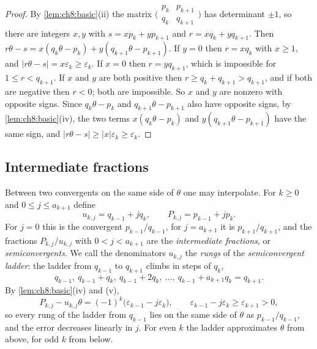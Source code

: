 \begin{proof}
By \cref{lem:ch8:basic}(ii) the matrix
$\bigl(\begin{smallmatrix}p_k&p_{k+1}\\q_k&q_{k+1}\end{smallmatrix}\bigr)$
has determinant $\pm1$, so there are integers $x,y$ with $s=xp_k+yp_{k+1}$ and
$r=xq_k+yq_{k+1}$. Then
$r\theta-s=x(q_k\theta-p_k)+y(q_{k+1}\theta-p_{k+1})$. If $y=0$ then
$r=xq_k$ with $x\geq1$, and $|r\theta-s|=x\varepsilon_k\geq\varepsilon_k$. If
$x=0$ then $r=yq_{k+1}$, which is impossible for $1\leq r<q_{k+1}$. If $x$
and $y$ are both positive then $r\geq q_k+q_{k+1}>q_{k+1}$, and if both are
negative then $r<0$; both are impossible. So $x$ and $y$ are nonzero with
opposite signs. Since $q_k\theta-p_k$ and $q_{k+1}\theta-p_{k+1}$ also have
opposite signs, by \cref{lem:ch8:basic}(iv), the two terms
$x(q_k\theta-p_k)$ and $y(q_{k+1}\theta-p_{k+1})$ have the same sign, and
$|r\theta-s|\geq|x|\varepsilon_k\geq\varepsilon_k$.
\end{proof}

\subsection{Intermediate fractions}

Between two convergents on the same side of $\theta$ one may interpolate. For
$k\geq0$ and $0\leq j\leq a_{k+1}$ define
\begin{equation}\label{eq:ch8:rung}
  u_{k,j}=q_{k-1}+jq_k,\qquad P_{k,j}=p_{k-1}+jp_k .
\end{equation}
For $j=0$ this is the convergent $p_{k-1}/q_{k-1}$, for $j=a_{k+1}$ it is
$p_{k+1}/q_{k+1}$, and the fractions $P_{k,j}/u_{k,j}$ with $0<j<a_{k+1}$
are the \emph{intermediate fractions}, or \emph{semiconvergents}. We call the
denominators $u_{k,j}$ the \emph{rungs} of the \emph{semiconvergent ladder}:
the ladder from $q_{k-1}$ to $q_{k+1}$ climbs in steps of $q_k$,
\[
  q_{k-1},\ q_{k-1}+q_k,\ q_{k-1}+2q_k,\ \dots,\ q_{k-1}+a_{k+1}q_k=q_{k+1}.
\]
By \cref{lem:ch8:basic}(iv) and (v),
\begin{equation}\label{eq:ch8:rungerr}
  P_{k,j}-u_{k,j}\theta=(-1)^{k}\bigl(\varepsilon_{k-1}-j\varepsilon_k\bigr),
  \qquad \varepsilon_{k-1}-j\varepsilon_k\geq\varepsilon_{k+1}>0,
\end{equation}
so every rung of the ladder from $q_{k-1}$ lies on the same side of $\theta$
as $p_{k-1}/q_{k-1}$, and the error decreases linearly in $j$. For even $k$
the ladder approximates $\theta$ from above, for odd $k$ from below.

